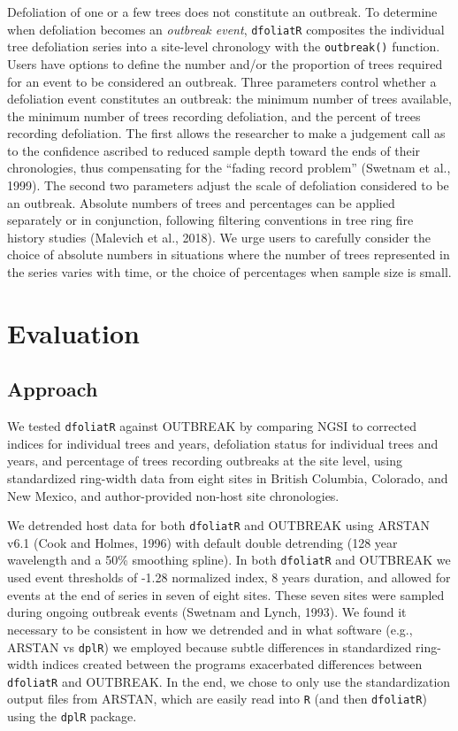 \documentclass[review]{elsarticle} %
\begin{document}
Defoliation of one or a few trees does not constitute an outbreak. To determine when defoliation becomes an \emph{outbreak event}, \texttt{dfoliatR} composites the individual tree defoliation series into a site-level chronology with the \texttt{outbreak()} function. Users have options to define the number and/or the proportion of trees required for an event to be considered an outbreak. Three parameters control whether a defoliation event constitutes an outbreak: the minimum number of trees available, the minimum number of trees recording defoliation, and the percent of trees recording defoliation. The first allows the researcher to make a judgement call as to the confidence ascribed to reduced sample depth toward the ends of their chronologies, thus compensating for the ``fading record problem'' (Swetnam et al., 1999). The second two parameters adjust the scale of defoliation considered to be an outbreak. Absolute numbers of trees and percentages can be applied separately or in conjunction, following filtering conventions in tree ring fire history studies (Malevich et al., 2018). We urge users to carefully consider the choice of absolute numbers in situations where the number of trees represented in the series varies with time, or the choice of percentages when sample size is small.

\hypertarget{evaluation}{%
\section{Evaluation}\label{evaluation}}

\hypertarget{approach}{%
\subsection{Approach}\label{approach}}

We tested \texttt{dfoliatR} against OUTBREAK by comparing NGSI to corrected indices for individual trees and years, defoliation status for individual trees and years, and percentage of trees recording outbreaks at the site level, using standardized ring-width data from eight sites in British Columbia, Colorado, and New Mexico, and author-provided non-host site chronologies.

We detrended host data for both \texttt{dfoliatR} and OUTBREAK using ARSTAN v6.1 (Cook and Holmes, 1996) with default double detrending (128 year wavelength and a 50\% smoothing spline). In both \texttt{dfoliatR} and OUTBREAK we used event thresholds of -1.28 normalized index, 8 years duration, and allowed for events at the end of series in seven of eight sites. These seven sites were sampled during ongoing outbreak events (Swetnam and Lynch, 1993). We found it necessary to be consistent in how we detrended and in what software (e.g., ARSTAN vs \texttt{dplR}) we employed because subtle differences in standardized ring-width indices created between the programs exacerbated differences between \texttt{dfoliatR} and OUTBREAK. In the end, we chose to only use the standardization output files from ARSTAN, which are easily read into \texttt{R} (and then \texttt{dfoliatR}) using the \texttt{dplR} package.
\end{document}
